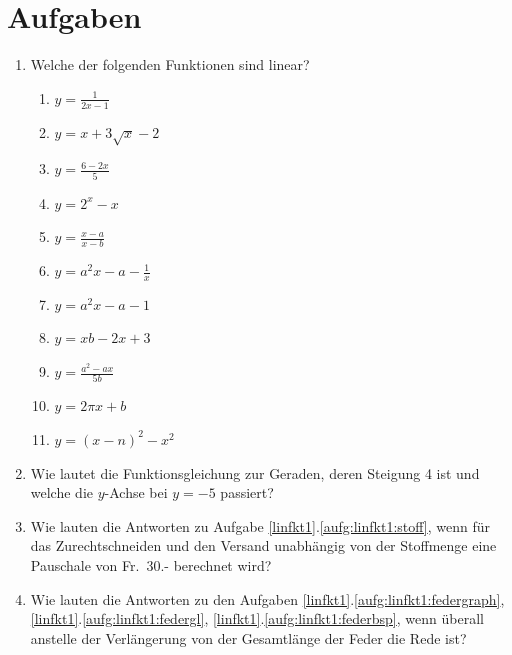 \documentclass[%
11pt,%
twoside,%
titlepage,%
german,%
headsepline%
]{scrartcl}
\begin{document}
{{\section*{Aufgaben}
{\settowidth{\labelwidth}{19.19}
\setlength{\leftmargini}{\labelwidth} \addtolength{\leftmargini}{\labelsep}
\renewcommand{\labelenumi}{\thesection.\arabic{enumi}}
\begin{enumerate}
\item Welche der folgenden Funktionen sind linear?
  \begin{enumerate}
  \item $\displaystyle y=\frac{1}{2x-1}$
  \item $\displaystyle y=x+3\sqrt{x}-2$
  \item \label{aufg:linfkt2:linear1} $\displaystyle y=\frac{6-2x}{5}$
  \item $\displaystyle y=2^x-x$
  \item $\displaystyle y=\frac{x-a}{x-b}$
  \item $\displaystyle y=a^2x-a-\frac{1}{x}$
  \item \label{aufg:linfkt2:linear2} $\displaystyle y=a^2x-a-1$
  \item \label{aufg:linfkt2:linear3} $\displaystyle y=xb-2x+3$
  \item \label{aufg:linfkt2:linear4} $\displaystyle y=\frac{a^2-ax}{5b}$
  \item \label{aufg:linfkt2:linear5} $\displaystyle y=2\pi x + b$
  \item \label{aufg:linfkt2:linear6} $\displaystyle y=(x-n)^2-x^2$
  \end{enumerate}
\item Wie lautet die Funktionsgleichung zur Geraden, deren Steigung 4 ist und welche die $y$-Achse bei $y=-5$ passiert?

\item Wie lauten die Antworten zu Aufgabe \ref{linfkt1}.\ref{aufg:linfkt1:stoff}, wenn f\"ur das Zurechtschneiden und den Versand unabh\"angig von der Stoffmenge eine Pauschale von Fr.~30.- berechnet wird?

\item Wie lauten die Antworten zu den Aufgaben \ref{linfkt1}.\ref{aufg:linfkt1:federgraph}, \ref{linfkt1}.\ref{aufg:linfkt1:federgl}, \ref{linfkt1}.\ref{aufg:linfkt1:federbsp}, wenn \"uberall anstelle der Verl\"angerung von der Gesamtl\"ange der Feder die Rede ist?


\end{enumerate}}}}
\end{document}
